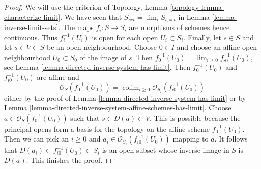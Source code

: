 \documentclass[10pt,a4paper]{amsart}
\theoremstyle{plain}
\theoremstyle{definition}
\theoremstyle{remark}
\numberwithin{equation}{subsection}
\def\lim{\mathop{\mathrm{lim}}\nolimits}
\def\colim{\mathop{\mathrm{colim}}\nolimits}
\begin{document}
\begin{proof}
We will use the criterion of
Topology, Lemma \ref{topology-lemma-characterize-limit}.
We have seen that $S_{set} = \lim_i S_{i, set}$ in
Lemma \ref{lemma-inverse-limit-sets}.
The maps $f_i : S \to S_i$ are morphisms of schemes
hence continuous. Thus $f_i^{-1}(U_i)$ is open for each
open $U_i \subset S_i$. Finally, 
let $s \in S$ and let $s \in V \subset S$ be an open
neighbourhood. Choose $0 \in I$ and choose an
affine open neighbourhood $U_0 \subset S_0$ of the image of $s$.
Then $f_0^{-1}(U_0) = \lim_{i \geq 0} f_{i0}^{-1}(U_0)$, see
Lemma \ref{lemma-directed-inverse-system-has-limit}.
Then $f_0^{-1}(U_0)$ and $f_{i0}^{-1}(U_0)$ are affine and
$$
\mathcal{O}_S(f_0^{-1}(U_0)) =
\colim_{i \geq 0} \mathcal{O}_{S_i}(f_{i0}^{-1}(U_0))
$$
either by the proof of
Lemma \ref{lemma-directed-inverse-system-has-limit}
or by
Lemma \ref{lemma-directed-inverse-system-affine-schemes-has-limit}.
Choose $a \in \mathcal{O}_S(f_0^{-1}(U_0))$ such that
$s \in D(a) \subset V$. This is possible because the principal
opens form a basis for the topology on the affine scheme $f_0^{-1}(U_0)$.
Then we can pick an $i \geq 0$ and
$a_i \in \mathcal{O}_{S_i}(f_{i0}^{-1}(U_0))$ mapping to $a$.
It follows that $D(a_i) \subset f_{i0}^{-1}(U_0) \subset S_i$
is an open subset whose inverse image in $S$ is $D(a)$.
This finishes the proof.
\end{proof}
\end{document}
